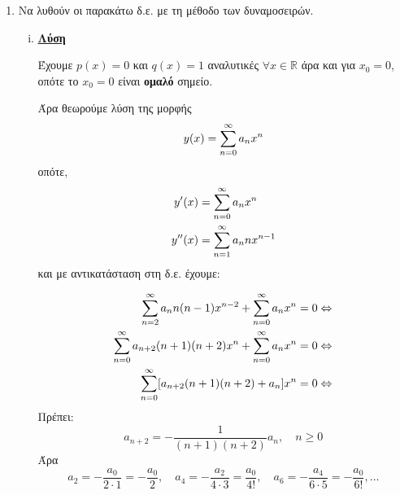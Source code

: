 










\begin{center}
\end{center}

\vspace{2\baselineskip}

\begin{enumerate}

\item Να λυθούν οι παρακάτω δ.ε. με τη μέθοδο των δυναμοσειρών.

\begin{enumerate}[i)]

\item {}

\vspace{\baselineskip}
\underline{\textbf{Λύση}}

\vspace{\baselineskip}
Έχουμε $p(x)=0$ και $q(x)=1$ αναλυτικές $\forall x\in\mathbb{R}$ άρα και για $x_0=0$, οπότε το $x_0=0$ είναι \textbf{ομαλό} σημείο. 

Άρα θεωρούμε λύση της μορφής 
\[
y(x)=\sum_{n=0}^{\infty}a_n x^n
\]
οπότε,
\begin{align*}
y'(x) &= \sum_{n=0}^{\infty}a_n x^n \\
y''(x) &= \sum_{n=1}^{\infty}a_n n x^{n-1}
\end{align*}
και με αντικατάσταση στη δ.ε. έχουμε:

\begin{align*}
\sum_{n=2}^{\infty}a_n n (n-1) x^{n-2}+\sum_{n=0}^{\infty}a_n x^n &=0 \Leftrightarrow \\
\sum_{n=0}^{\infty}a_{n+2}(n+1)(n+2)x^{n}+\sum_{n=0}^{\infty}a_n x^n &=0 \Leftrightarrow \\
\sum_{n=0}^{\infty}[a_{n+2}(n+1)(n+2)+a_n]x^n &=0 \Leftrightarrow \\
\end{align*}
Πρέπει:
\[
a_{n+2}=-\frac{1}{(n+1)(n+2)}a_n,\quad n\geq 0
\]
Άρα 
\[
a_2=-\frac{a_0}{2\cdot 1}=-\frac{a_0}{2},\quad a_4=-\frac{a_2}{4\cdot 3}=\frac{a_0}{4!},\quad a_6=-\frac{a_4}{6\cdot 5}=-\frac{a_0}{6!}, \ldots
\]

\end{enumerate}

\end{enumerate}





